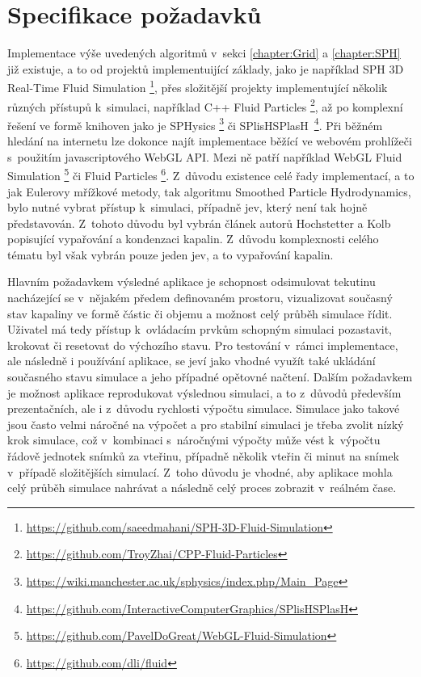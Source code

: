 \section{Specifikace požadavků}
\label{chapter:spec}
Implementace výše uvedených algoritmů v~sekci \ref{chapter:Grid} a \ref{chapter:SPH} již existuje, a to od projektů implementuijící základy, jako je například SPH 3D Real-Time Fluid Simulation \footnote{\url{https://github.com/saeedmahani/SPH-3D-Fluid-Simulation}}, přes složitější projekty implementující několik různých přístupů k~simulaci, například C++ Fluid Particles \footnote{\url{https://github.com/TroyZhai/CPP-Fluid-Particles}}, až po komplexní řešení ve formě knihoven jako je SPHysics \footnote{\url{https://wiki.manchester.ac.uk/sphysics/index.php/Main_Page}} či SPlisHSPlasH~\footnote{\url{https://github.com/InteractiveComputerGraphics/SPlisHSPlasH}}. Při běžném hledání na internetu lze dokonce najít implementace běžící ve webovém prohlížeči s~použitím javascriptového WebGL API. Mezi ně patří například WebGL Fluid Simulation \footnote{\url{https://github.com/PavelDoGreat/WebGL-Fluid-Simulation}} či Fluid Particles \footnote{\url{https://github.com/dli/fluid}}. Z~důvodu existence celé řady implementací, a to jak Eulerovy mřížkové metody, tak algoritmu Smoothed Particle Hydrodynamics, bylo nutné vybrat přístup k~simulaci, případně jev, který není tak hojně představován. Z~tohoto důvodu byl vybrán článek autorů Hochstetter a Kolb popisující vypařování a kondenzaci kapalin. Z~důvodu komplexnosti celého tématu byl však vybrán pouze jeden jev, a to vypařování kapalin.

Hlavním požadavkem výsledné aplikace je schopnost odsimulovat tekutinu nacházející se v~nějakém předem definovaném prostoru, vizualizovat současný stav kapaliny ve formě částic či objemu a možnost celý průběh simulace řídit. Uživatel má tedy přístup k~ovládacím prvkům schopným simulaci pozastavit, krokovat či resetovat do výchozího stavu. Pro testování v~rámci implementace, ale následně i používání aplikace, se jeví jako vhodné využít také ukládání současného stavu simulace a jeho případné opětovné načtení. Dalším požadavkem je možnost aplikace reprodukovat výslednou simulaci, a to z~důvodů především prezentačních, ale i z~důvodu rychlosti výpočtu simulace. Simulace jako takové jsou často velmi náročné na výpočet a pro stabilní simulaci je třeba zvolit nízký krok simulace, což v~kombinaci s~náročnými výpočty může vést k~výpočtu řádově jednotek snímků za vteřinu, případně několik vteřin či minut na snímek v~případě složitějších simulací. Z~toho důvodu je vhodné, aby aplikace mohla celý průběh simulace nahrávat a následně celý proces zobrazit v~reálném čase. 

